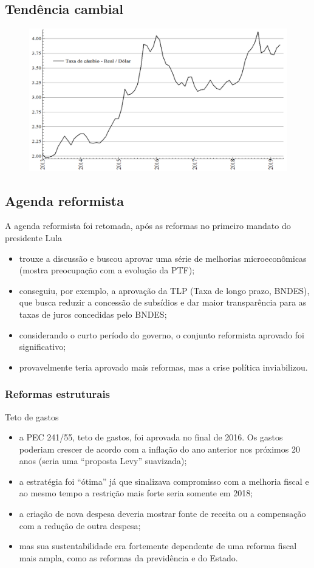 \documentclass[a4paper,12pt]{article}[abntex2]
\begin{document}
\subsection{\textbf{Tendência cambial}}
\begin{figure}[H]
    \centering
    \includegraphics[width=0.7\linewidth]{Imagens/a19i3.png}
\end{figure}

\subsection{\textbf{Agenda reformista}}
A agenda reformista foi retomada, após as reformas no primeiro mandato do presidente Lula\begin{itemize}
    \item trouxe a discussão e buscou aprovar uma série de melhorias microeconômicas (mostra preocupação com a evolução da PTF);
    \item conseguiu, por exemplo, a aprovação da TLP (Taxa de longo prazo, BNDES), que busca reduzir a concessão de subsídios e dar maior transparência para as taxas de juros concedidas pelo BNDES;
    \item considerando o curto período do governo, o conjunto reformista aprovado foi significativo;
    \item provavelmente teria aprovado mais reformas, mas a crise política inviabilizou.
\end{itemize}

\subsubsection{\textbf{Reformas estruturais}}
Teto de gastos\begin{itemize}
    \item a PEC 241/55, teto de gastos, foi aprovada no final de 2016. Os gastos poderiam crescer de acordo com a inflação do ano anterior nos próximos 20 anos (seria uma “proposta Levy” suavizada);
    \item a estratégia foi “ótima” já que sinalizava compromisso com a melhoria fiscal e ao mesmo tempo a restrição mais forte seria somente em 2018;
    \item a criação de nova despesa deveria mostrar fonte de receita ou a compensação com a redução de outra despesa;
    \item mas sua sustentabilidade era fortemente dependente de uma reforma fiscal mais ampla, como as reformas da previdência e do Estado.
\end{itemize}
\end{document}
